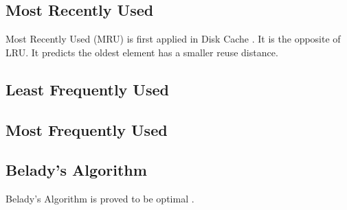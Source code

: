 \subsection{Most Recently Used}
Most Recently Used (MRU) is first applied in Disk Cache \cite{mru}. 
It is the opposite of LRU.
It predicts the oldest element has a smaller reuse distance.


\subsection{Least Frequently Used}

\subsection{Most Frequently Used}

\subsection{Belady's Algorithm}
Belady's Algorithm is proved to be optimal \cite{belady}.
